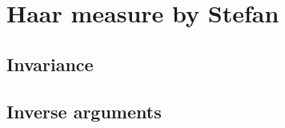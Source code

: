 \documentclass[../../note.tex]{subfiles}
\begin{document}
\chapter{Haar measure by Stefan}

\section{Invariance}

\section{Inverse arguments}
\end{document}
